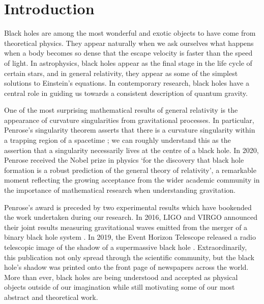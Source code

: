 \chapter{Introduction}
\label{ch:introduction}

Black holes are among the most wonderful and exotic objects to have come from theoretical physics. They appear naturally when we ask ourselves what happens when a body becomes so dense that the escape velocity is faster than the speed of light. In astrophysics, black holes appear as the final stage in the life cycle of certain stars, and in general relativity, they appear as some of the simplest solutions to Einstein's equations. In contemporary research, black holes have a central role in guiding us towards a consistent description of quantum gravity.

One of the most surprising mathematical results of general relativity is the appearance of curvature singularities from gravitational processes. In particular, Penrose's singularity theorem asserts that there is a curvature singularity within a trapping region of a spacetime \cite{Penrose:1964wq}; we can roughly understand this as the assertion that a singularity necessarily lives at the centre of a black hole. In 2020, Penrose received the Nobel prize in physics `for the discovery that black hole formation is a robust prediction of the general theory of relativity', a remarkable moment reflecting the growing acceptance from the wider academic community in the importance of mathematical research when understanding gravitation. 

Penrose's award is preceded by two experimental results which have bookended the work undertaken during our research. In 2016, LIGO and VIRGO announced their joint results measuring gravitational waves emitted from the merger of a binary black hole system \cite{Abbott:2016blz}. In 2019, the Event Horizon Telescope released a radio telescopic image of the shadow of a supermassive black hole \cite{Akiyama:2019cqa}. Extraordinarily, this publication not only spread through the scientific community, but the black hole's shadow was printed onto the front page of newspapers across the world. More than ever, black holes are being understood and accepted as physical objects outside of our imagination while still motivating some of our most abstract and theoretical work.

